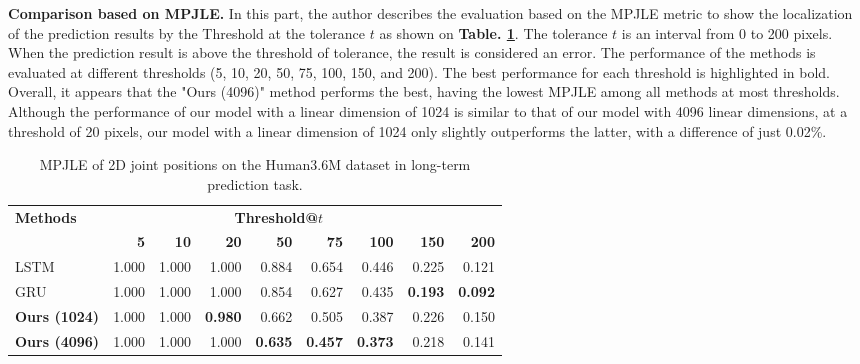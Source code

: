 \textbf{Comparison based on MPJLE.} In this part, the author describes the evaluation based on the MPJLE metric to show the localization of the prediction results by the Threshold at the tolerance $t$ as shown on \textbf{Table. \ref{tbl:2DMPJLE_hum36m}}. The tolerance $t$ is an interval from 0 to 200 pixels. When the prediction result is above the threshold of tolerance, the result is considered an error. The performance of the methods is evaluated at different thresholds (5, 10, 20, 50, 75, 100, 150, and 200). The best performance for each threshold is highlighted in bold. Overall, it appears that the "Ours (4096)" method performs the best, having the lowest MPJLE among all methods at most thresholds. Although the performance of our model with a linear dimension of 1024 is similar to that of our model with 4096 linear dimensions, at a threshold of 20 pixels, our model with a linear dimension of 1024 only slightly outperforms the latter, with a difference of just 0.02\%.

\begin{table}
    \centering
    \caption{MPJLE of 2D joint positions on the Human3.6M dataset in long-term prediction task.}
    \begin{tabular}{l|rrrrrrrr}
        \toprule
        \multirow{ 2}{*}{\textbf{Methods}}   & \multicolumn{7}{c}{\textbf{Threshold@$t$}} \\
          & \textbf{5} & \textbf{10} & \textbf{20} & \textbf{50} & \textbf{75} & \textbf{100} & \textbf{150} & \textbf{200} \\
          \midrule
        LSTM	&	1.000	&	1.000	&	1.000	&	0.884	&	0.654	&	0.446	&	0.225	&	0.121 \\
        GRU	&	1.000	&	1.000	&	1.000	&	0.854	&	0.627	&	0.435	&	\textbf{0.193}	&	\textbf{0.092} \\
        \textbf{Ours (1024)}	&	1.000	&	1.000	&	\textbf{0.980}	&	0.662	&	0.505	&	0.387	&	0.226	&	0.150 \\
        \textbf{Ours (4096)}	&	1.000	&	1.000	&	1.000	&	\textbf{0.635}	&	\textbf{0.457}	&	\textbf{0.373}	&	0.218	&	0.141 \\
        \bottomrule
    \end{tabular}
    \label{tbl:2DMPJLE_hum36m}
\end{table}

